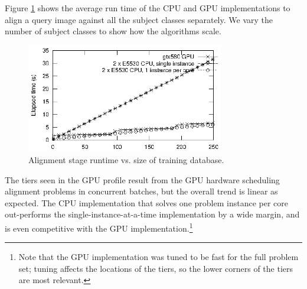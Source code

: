 \documentclass[10pt,twocolumn,letterpaper]{article}
\begin{document}
Figure \ref{fig:alignment_stage_runtime} shows the average run time of the CPU and GPU implementations to align
a query image against all the subject classes separately. We vary the number of
subject classes to show how the algorithms scale. 
\begin{figure}
\centering
\includegraphics[width=3.4in]{figures/alignment_runtime_graph}
\caption{Alignment stage runtime vs. size of training database.}
\label{fig:alignment_stage_runtime}
\end{figure}
The tiers seen in the GPU profile result from the GPU hardware scheduling alignment
problems in concurrent batches, but the overall trend is linear as expected.
The CPU implementation that solves one problem instance per core out-performs
the single-instance-at-a-time implementation by a wide margin, and is even competitive
with the GPU implementation.\footnote{Note that the GPU implementation was tuned
to be fast for the full problem set; tuning affects the locations of the tiers,
so the lower corners of the tiers are most relevant.}

\end{document}
